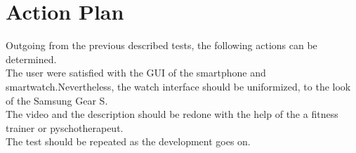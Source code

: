 \section{Action Plan}
Outgoing from the previous described tests, the following actions can be determined.\\
The user were satisfied with the GUI of the smartphone and smartwatch.Nevertheless, the watch interface should be uniformized, to the look of the Samsung Gear S.\\
The video and the description should be redone with the help of the a fitness trainer or pyschotherapeut. \\
The test should be repeated as the development goes on.  
